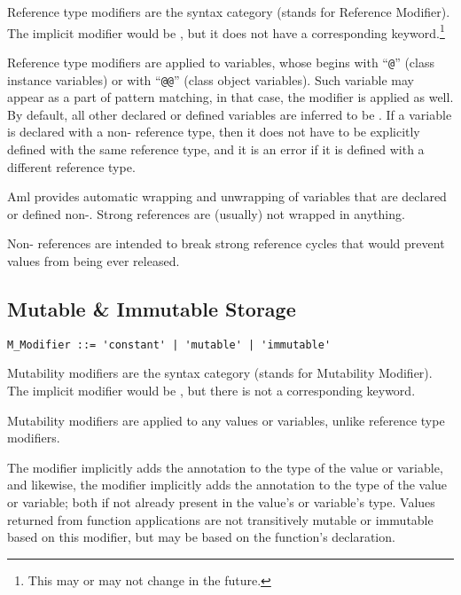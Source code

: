 Reference type modifiers are the syntax category  (stands for Reference Modifier). The implicit modifier would be , but it does not have a corresponding keyword.\footnote{This may or may not change in the future.} 

Reference type modifiers are applied to variables, whose  begins with ``\lstinline!@!'' (class instance variables) or with ``\lstinline!@@!'' (class object variables). Such variable may appear as a part of pattern matching, in that case, the modifier is applied as well. By default, all other declared or defined variables are inferred to be . If a variable is declared with a non- reference type, then it does not have to be explicitly defined with the same reference type, and it is an error if it is defined with a different reference type. 

Aml provides automatic wrapping and unwrapping of variables that are declared or defined non-. Strong references are (usually) not wrapped in anything. 

Non- references are intended to break strong reference cycles that would prevent values from being ever released. 





\subsection{Mutable \& Immutable Storage}
\label{sec:mutable-immutable-storage}

\grammar\begin{lstlisting}
M_Modifier ::= 'constant' | 'mutable' | 'immutable'
\end{lstlisting}

Mutability modifiers are the syntax category  (stands for Mutability Modifier). The implicit modifier would be , but there is not a corresponding keyword. 

Mutability modifiers are applied to any values or variables, unlike reference type modifiers. 

The  modifier implicitly adds the  annotation to the type of the value or variable, and likewise, the  modifier implicitly adds the  annotation to the type of the value or variable; both if not already present in the value's or variable's type. Values returned from function applications are not transitively mutable or immutable based on this modifier, but may be based on the function's declaration. 

